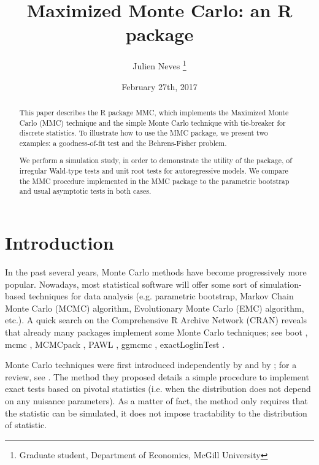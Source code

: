 \documentclass[11pt]{article}\usepackage[]{graphicx}\usepackage[]{color}
\newcommand{\pkg}[1]{{\normalfont\fontseries{b}\selectfont #1}}
\let\proglang=\textsf
\begin{document}
\title{Maximized Monte Carlo: an \proglang{R} package}
\author{Julien Neves \thanks{Graduate student, Department of Economics, McGill University}}
\date{February 27th, 2017}

\maketitle

\begin{abstract}
	This paper describes the \proglang{R} package \pkg{MMC}, which implements the Maximized Monte Carlo (MMC) technique and the simple Monte Carlo technique with tie-breaker for discrete statistics. To illustrate how to use the \pkg{MMC} package, we present two examples: a goodness-of-fit test and the Behrens-Fisher problem.

	We perform a simulation study, in order to demonstrate the utility of the package, of irregular Wald-type tests and unit root tests for autoregressive models. We compare the MMC procedure implemented in the \pkg{MMC} package to the parametric bootstrap and usual asymptotic tests in both cases.
\end{abstract}

\clearpage

\tableofcontents

\clearpage

\section{Introduction}
\label{intro}

In the past several years, Monte Carlo methods have become progressively more popular. Nowadays, most statistical software will offer some sort of simulation-based techniques for data analysis (e.g. parametric bootstrap, Markov Chain Monte Carlo (MCMC) algorithm, Evolutionary Monte Carlo (EMC) algorithm, etc.). A quick search on the Comprehensive \proglang{R} Archive Network (CRAN) reveals that already many packages implement some Monte Carlo techniques; see \pkg{boot} \citep{canty_boot:_2016}, \pkg{mcmc} \citep{geyer_mcmc:_2015}, \pkg{MCMCpack} \citep{martin_mcmcpack:_2011}, \pkg{PAWL} \citep{bornn_pawl:_2012}, \pkg{ggmcmc} \citep{fernandez-i-marin_ggmcmc:_2016}, \pkg{exactLoglinTest} \citep{caffo_exactloglintest:_2013}.

Monte Carlo techniques were first introduced independently by \cite{dwass_modified_1957} and by \cite{barnard_comment_1963}; for a review, see \cite{dufour_monte_2003}. The method they proposed details a simple procedure to implement exact tests based on pivotal statistics (i.e. when the distribution does not depend on any nuisance parameters). As a matter of fact, the method only requires that the statistic can be simulated, it does not impose tractability to the distribution of statistic.
\end{document}
